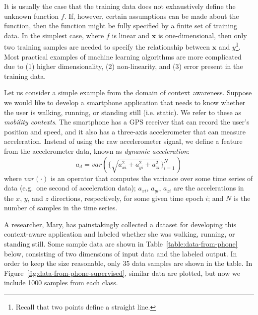 It is usually the case that the training data does not exhaustively define the unknown function $f$. If, however, certain assumptions can be made about the function, then the function might be fully specified by a finite set of training data. In the simplest case, where $f$ is linear and $\mathbf{x}$ is one-dimensional, then only two training samples are needed to specify the relationship between $\mathbf{x}$ and $y$\footnote{Recall that two points define a straight line.}. Most practical examples of machine learning algorithms are more complicated due to (1) higher dimensionality, (2) non-linearity, and (3) error present in the training data.

Let us consider a simple example from the domain of context awareness. Suppose we would like to develop a smartphone application that needs to know whether the user is walking, running, or standing still (i.e. static). We refer to these as \emph{mobility contexts}. The smartphone has a GPS receiver that can record the user's position and speed, and it also has a three-axis accelerometer that can measure acceleration. Instead of using the raw accelerometer signal, we define a feature from the accelerometer data, known as \emph{dynamic acceleration}:
%
\begin{equation}
a_d = var(\{\sqrt{a_{xi}^2 + a_{yi}^2 + a_{zi}^2}\}_{i=1}^N\,)
\end{equation}
%
where $var(\cdot)$ is an operator that computes the variance over some time series of data (e.g.\ one second of acceleration data); $a_{xi}$, $a_{yi}$, $a_{zi}$ are the accelerations in the $x$, $y$, and $z$ directions, respectively, for some given time epoch $i$; and $N$ is the number of samples in the time series.

A researcher, Mary, has painstakingly collected a dataset for developing this context-aware application and labeled whether she was walking, running, or standing still. Some sample data are shown in Table~\ref{table:data-from-phone} below, consisting of two dimensions of input data and the labeled output. In order to keep the size reasonable, only 35 data samples are shown in the table. In Figure~\ref{fig:data-from-phone-supervised}, similar data are plotted, but now we include 1000 samples from each class.

